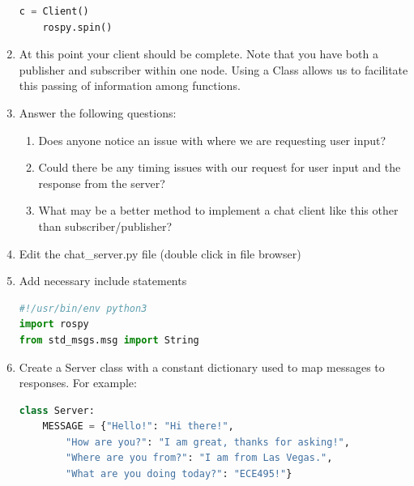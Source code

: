 \documentclass{handout}
\begin{document}
\begin{enumerate}
\begin{lstlisting}[language=python]
    c = Client()
    rospy.spin()
\end{lstlisting}
	\item At this point your client should be complete. Note that you have both a publisher and subscriber within one node. Using a Class allows us to facilitate this passing of information among functions.
	\item Answer the following questions:
	\begin{enumerate}
		\item Does anyone notice an issue with where we are requesting user input?
		\item Could there be any timing issues with our request for user input and the response from the server?
		\item What may be a better method to implement a chat client like this other than subscriber/publisher?
	\end{enumerate}
	\item Edit the chat\_server.py file (double click in file browser)
	\item Add necessary include statements
\begin{lstlisting}[language=python]
#!/usr/bin/env python3
import rospy
from std_msgs.msg import String
\end{lstlisting}
	\item Create a Server class with a constant dictionary used to map messages to responses. For example:
\begin{lstlisting}[language=python]
class Server:
    MESSAGE = {"Hello!": "Hi there!", 
        "How are you?": "I am great, thanks for asking!", 
        "Where are you from?": "I am from Las Vegas.", 
        "What are you doing today?": "ECE495!"}
    

\end{lstlisting}
\end{enumerate}
\end{document}
